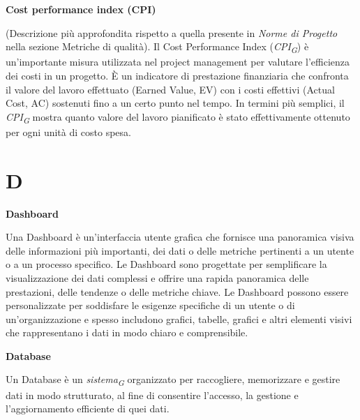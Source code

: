\documentclass{article}
\begin{document}
\vspace{0.4cm}

\textbf{Cost performance index (CPI)}

\vspace{0.1cm}

(Descrizione più approfondita rispetto a quella presente in \textit{Norme di Progetto} nella sezione Metriche di qualità). Il Cost Performance Index (\textit{CPI}\textsubscript{\textit{G}}) è un'importante misura utilizzata nel project management per valutare l'efficienza dei costi in un progetto. È un indicatore di prestazione finanziaria che confronta il valore del lavoro effettuato (Earned Value, EV) con i costi effettivi (Actual Cost, AC) sostenuti fino a un certo punto nel tempo. In termini più semplici, il \textit{CPI}\textsubscript{\textit{G}} mostra quanto valore del lavoro pianificato è stato effettivamente ottenuto per ogni unità di costo spesa.

\pagebreak
\section*{D}
{}

\vspace{0.4cm}

\textbf{Dashboard}

\vspace{0.1cm}

Una Dashboard è un'interfaccia utente grafica che fornisce una panoramica visiva delle informazioni più importanti, dei dati o delle metriche pertinenti a un utente o a un processo specifico. Le Dashboard sono progettate per semplificare la visualizzazione dei dati complessi e offrire una rapida panoramica delle prestazioni, delle tendenze o delle metriche chiave. Le Dashboard possono essere personalizzate per soddisfare le esigenze specifiche di un utente o di un'organizzazione e spesso includono grafici, tabelle, grafici e altri elementi visivi che rappresentano i dati in modo chiaro e comprensibile.

\vspace{0.4cm}

\textbf{Database}

\vspace{0.1cm}

Un Database è un \textit{sistema}\textsubscript{\textit{G}} organizzato per raccogliere, memorizzare e gestire dati in modo strutturato, al fine di consentire l'accesso, la gestione e l'aggiornamento efficiente di quei dati.
\end{document}
